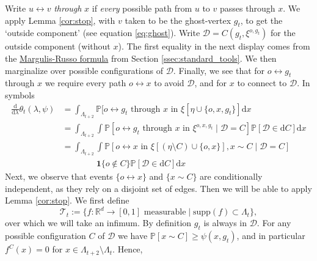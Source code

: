 \documentclass[a4paper,12pt]{scrartcl}
\newcommand{\conn}{\psi}
\renewcommand{\P}{\mathbb{P}}
\renewcommand{\d}{\mathrm{d}}
\newcommand{\reals}{\mathbb{R}}
\theoremstyle{definition}
\theoremstyle{remark}
\begin{document}
Write $u\leftrightarrow v$ \emph{through} $x$ if \emph{every} possible path from $u$ to $v$ passes through $x$. We apply Lemma \ref{cor:stop}, with $v$ taken
to be the ghost-vertex $g_t$,
to get the `outside component' (see equation \eqref{eq:ghost}). Write $\mathcal D = C(g_t,\xi^{o,g_t})$ for the outside component (without $x$). The first equality in the next display comes from the \hyperref[par:Margulis]{Margulis-Russo formula} from Section \ref{ssec:standard_tools}. We then marginalize over possible configurations of $\mathcal D$. Finally, we see that for $o\leftrightarrow g_t$ through $x$ we require every path $o\leftrightarrow x$ to avoid $\mathcal D$, and for $x$ to connect to $\mathcal D$. In symbols
\begin{equation}
  \begin{aligned}
    \frac{\d}{\d\lambda}\theta_t(\lambda, \psi)
    & =
    \int_{\Lambda_{t+2}}
    \P[o\leftrightarrow g_t \text{ through } x \text{ in }
      \xi[\eta\cup\{o,x,g_t\}]
      \d x                       \\
      & =
      \int_{\Lambda_{t+2}}\int
      \P[
        o\leftrightarrow g_t \text{ through } x \text{ in } \xi^{o,x,g_t}
        \mid
        \mathcal D = C
      ]
      \P[\mathcal D\in \d C]\d x \\
      & =
      \int_{\Lambda_{t+2}}\int
      \P[
        o\leftrightarrow x\text{ in } \xi[(\eta\setminus C)\cup\{o,x\}],
        x\sim C
        \mid
        \mathcal D = C
      ]                          \\&\qquad\qquad
      \mathbf{1}\{o\not\in C\}
      \P[\mathcal D\in \d C]\d x
    \end{aligned}
  \end{equation}
  Next, we observe that events  $\{o\leftrightarrow x\}$ and
  $\{x\sim C\}$ are conditionally independent, as they rely on a disjoint set of edges. Then we will be able to apply Lemma \ref{cor:stop}. We first define
  \begin{equation}
    \mathcal T_t :=
    \{
      f:\reals^d\to[0,1] \text{ measurable}
      \mid
      \text{supp}(f)\subset\Lambda_t
    \},
  \end{equation}
  over which we will take an infimum. By definition $g_t$ is always in $\mathcal D$. For any possible configuration $C$ of $\mathcal D$ we have $\P[x\sim C]\geq \conn(x,g_t)$, and in particular
  $f^C(x) = 0 $ for $x \in \Lambda_{t+2} \setminus \Lambda_t$.
  Hence,
\end{document}
